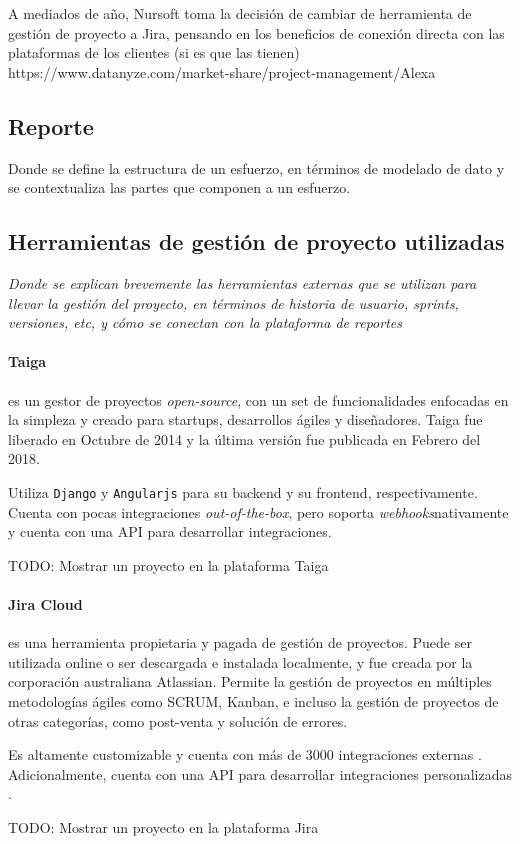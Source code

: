 A mediados de año, Nursoft toma la decisión de cambiar de herramienta de gestión de proyecto a Jira,
pensando en los beneficios de conexión directa con las plataformas de los clientes (si es que las tienen)
https://www.datanyze.com/market-share/project-management/Alexa%

\subsection{Reporte}
Donde se define la estructura de un esfuerzo, en términos de modelado de dato y se contextualiza las partes que componen a un esfuerzo.

\subsection{Herramientas de gestión de proyecto utilizadas}

\textit{Donde se explican brevemente las herramientas externas que se utilizan para llevar
la gestión del proyecto, en términos de historia de usuario, sprints, versiones, etc, y cómo se conectan con la plataforma de reportes}


\paragraph{Taiga} es un gestor de proyectos \textit{open-source}, con un set de funcionalidades
enfocadas en la simpleza y creado para startups, desarrollos ágiles y diseñadores.
Taiga fue liberado en Octubre de 2014 y la última versión fue publicada en Febrero del 2018.

Utiliza \verb|Django| y \verb|Angularjs| para su backend y su frontend, respectivamente.
Cuenta con pocas integraciones \textit{out-of-the-box}, pero soporta
\textit{webhooks}\footnotemark[7] nativamente y cuenta con una API para desarrollar 
integraciones\cite{taiga_webhooks}\cite{taiga_api}.

TODO: Mostrar un proyecto en la plataforma Taiga


\paragraph{Jira Cloud} es una herramienta propietaria y pagada de gestión de proyectos. 
Puede ser utilizada online o ser descargada e instalada localmente, y fue creada
por la corporación australiana Atlassian. Permite la gestión de proyectos en múltiples metodologías
ágiles como SCRUM, Kanban, e incluso la gestión de proyectos de otras categorías, como post-venta y
solución de errores. 

Es altamente customizable y cuenta con más de 3000 integraciones
externas \cite{jira_features}. Adicionalmente, cuenta con una API para desarrollar integraciones
personalizadas \cite{jira_api}.

TODO: Mostrar un proyecto en la plataforma Jira